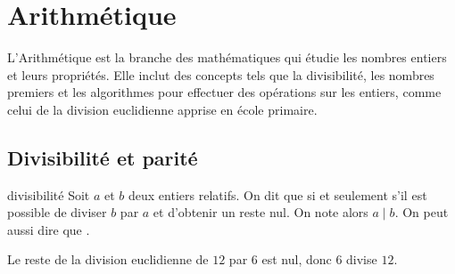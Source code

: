 \documentclass[12pt]{article}
\begin{document}







\section{Arithmétique}
L'Arithmétique est la branche des mathématiques qui étudie les nombres entiers et leurs propriétés. Elle inclut des concepts tels que la divisibilité, les nombres premiers et les algorithmes pour effectuer des opérations sur les entiers, comme celui de la division euclidienne apprise en école primaire.

\subsection{Divisibilité et parité}
\begin{definition}{}{divisibilité}
    Soit \(a\) et \(b\) deux entiers relatifs. On dit que  si et seulement s'il est possible de diviser $b$ par $a$ et d'obtenir un reste nul. On note alors \(a \mid b\). On peut aussi dire que .
\end{definition}

\begin{exemple}{}{}
    Le reste de la division euclidienne de $12$ par $6$ est nul, donc $6$ divise $12$.
\end{exemple}
\end{document}
